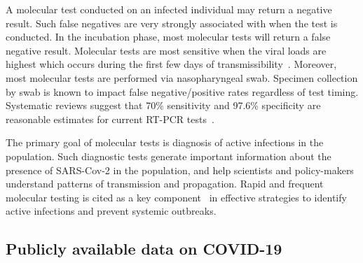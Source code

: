 \documentclass[11pt]{amsart}
\numberwithin{equation}{section}
\theoremstyle{plain}
\begin{document}
A molecular test conducted on an infected individual may return a negative result.  Such false negatives are very strongly associated with when the test is conducted.  In the incubation phase, most molecular tests will return a false negative result.  Molecular tests are most sensitive when the viral loads are highest which occurs during the first few days of transmissibility~\citep{Mina2020}.   Moreover, most molecular tests are performed via nasopharyngeal swab.  Specimen collection by swab is known to impact false negative/positive rates regardless of test timing.   Systematic reviews suggest that 70\% sensitivity and 97.6\% specificity are reasonable estimates for current RT-PCR tests~\cite{Woloshin2020,Cohen2020}.

The primary goal of molecular tests is diagnosis of active infections in the population.  Such diagnostic tests generate important information about the presence of SARS-Cov-2 in the population, and help scientists and policy-makers understand patterns of transmission and propagation. Rapid and frequent molecular testing is cited as a key component~\cite{OECD2021} in effective strategies to identify active infections and prevent systemic outbreaks.



\subsection{Publicly available data on COVID-19}
\label{subsection:testinginfo}
\end{document}
